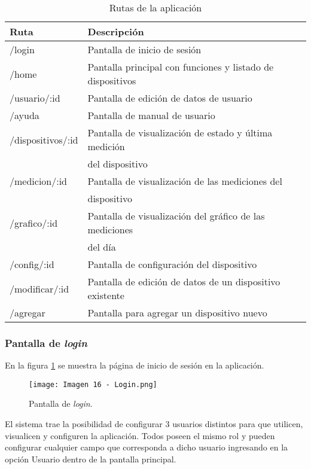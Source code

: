 \begin{table}[h]
\centering
\caption[Rutas]{Rutas de la aplicación}
\begin{tabular}{l l}
\toprule
\textbf{Ruta} 			& \textbf{Descripción}\\
\midrule
/login					& Pantalla de inicio de sesión\\
/home					& Pantalla principal con funciones y listado de dispositivos\\
/usuario/:id				& Pantalla de edición de datos de usuario\\
/ayuda					& Pantalla de manual de usuario\\
/dispositivos/:id		& Pantalla de visualización de estado y última medición\\
						& del dispositivo\\
/medicion/:id			& Pantalla de visualización de las mediciones del\\
						& dispositivo\\
/grafico/:id				& Pantalla de visualización del gráfico de las mediciones\\
						& del día\\
/config/:id				& Pantalla de configuración del dispositivo\\
/modificar/:id			& Pantalla de edición de datos de un dispositivo existente\\
/agregar					& Pantalla para agregar un dispositivo nuevo\\
\bottomrule
\hline
\end{tabular}
\label{tab:rutas}
\end{table}

\subsubsection{Pantalla de \textit{login}}

En la figura \ref{fig:16} se muestra la página de inicio de sesión en la aplicación.

\begin{figure}[h]
\centering
\texttt{[image: Imagen 16 - Login.png]}
\caption[Pantalla login]{Pantalla de \textit{login}. \footnotemark}
\label{fig:16}
\end{figure}

El sistema trae la posibilidad de configurar 3 usuarios distintos para que utilicen, visualicen y configuren la aplicación. Todos poseen el mismo rol y pueden configurar cualquier campo que corresponda a dicho usuario ingresando en la opción Usuario dentro de la pantalla principal.

